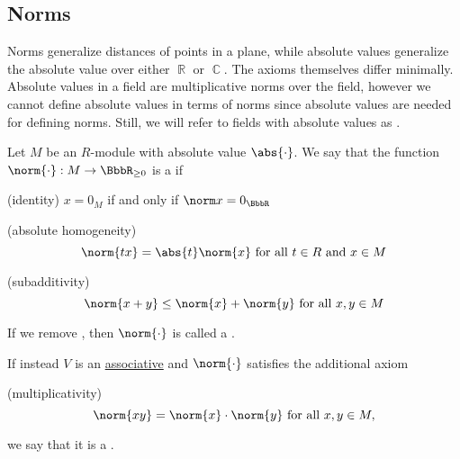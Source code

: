\subsection{Norms}\label{subsec:norms}

\begin{remark}\label{rem:normed_fields}
  Norms generalize distances of points in a plane, while absolute values generalize the absolute value over either \( \BbbR \) or \( \BbbC \). The axioms themselves differ minimally. Absolute values in a field are multiplicative norms over the field, however we cannot define absolute values in terms of norms since absolute values are needed for defining norms. Still, we will refer to fields with absolute values as .
\end{remark}

\begin{definition}\label{def:norm}
  Let \( M \) be an \( R \)-module with absolute value \( \abs{\cdot} \). We say that the function \( \norm{\cdot}: M \to \BbbR_{\geq 0} \) is a  if
  \begin{thmenum}
    (identity) \( x = 0_M \) if and only if \( \norm x = 0_{\BbbR} \)

    (absolute homogeneity)
    \begin{equation*}
      \norm{t x} = \abs{t} \norm{x} \text{ for all } t \in R \text{ and } x \in M
    \end{equation*}

    (subadditivity)
    \begin{equation*}
      \norm{x + y} \leq \norm{x} + \norm{y} \text{ for all } x, y \in M
    \end{equation*}
  \end{thmenum}

  If we remove , then \( \norm{\cdot} \) is called a .

  If instead \( V \) is an \hyperref[def:algebra_over_semiring]{associative} and \( \norm{\cdot} \) satisfies the additional axiom
  \begin{thmenum}
    (multiplicativity)
    \begin{equation*}
      \norm{xy} = \norm{x} \cdot \norm{y} \text{ for all } x, y \in M,
    \end{equation*}
  \end{thmenum}
  we say that it is a .
\end{definition}

